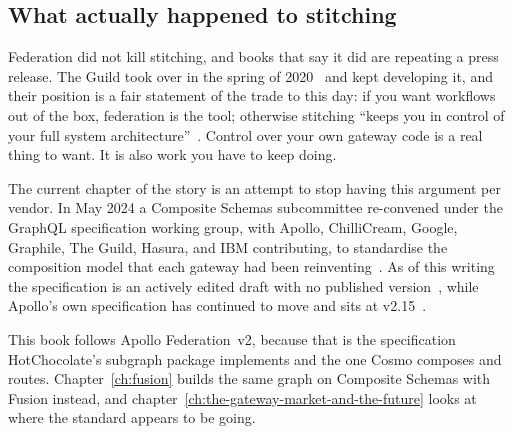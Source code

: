 \subsection*{What actually happened to stitching}

Federation did not kill stitching, and books that say it did are repeating a
press release. The Guild took over  in the spring of
2020~\autocite{tanrikulu2020tools6} and kept developing it, and their position
is a fair statement of the trade to this day: if you want workflows out of the
box, federation is the tool; otherwise stitching \enquote{keeps you in control
of your full system architecture}~\autocite{macwilliam2021stitching}. Control
over your own gateway code is a real thing to want. It is also work you have to
keep doing.

The current chapter of the story is an attempt to stop having this argument
per vendor. In May 2024 a Composite Schemas subcommittee re-convened under the
GraphQL specification working group, with Apollo, ChilliCream, Google, Graphile,
The Guild, Hasura, and IBM contributing, to standardise the composition model
that each gateway had been reinventing~\autocite{graphql2024composite}. As of
this writing the specification is an actively edited draft with no published
version~\autocite{compositeschemas2026draft}, while Apollo's own specification
has continued to move and sits at v2.15~\autocite{apollo2026versions}.

This book follows Apollo Federation~v2, because that is the specification
HotChocolate's subgraph package implements and the one Cosmo composes and
routes. Chapter~\ref{ch:fusion} builds the same graph on Composite Schemas with
Fusion instead, and chapter~\ref{ch:the-gateway-market-and-the-future} looks at
where the standard appears to be going.
